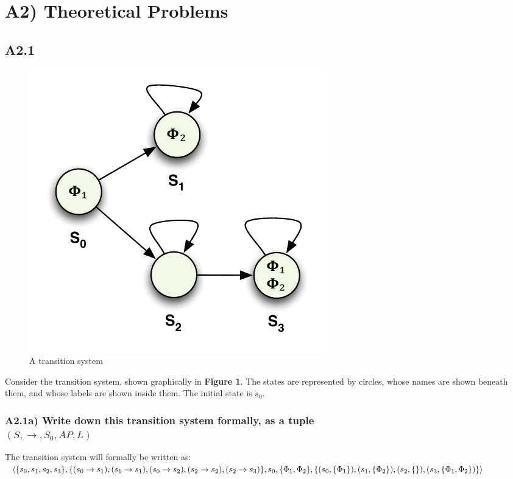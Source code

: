 \documentclass[12pt]{report}
\begin{document}
\section*{A2) Theoretical Problems}
\subsection*{A2.1}
\begin{figure}[H]
	\centering
	\includegraphics[scale=0.75]{../GFX/ExerciseFigure1.pdf}
	\caption{A transition system}
\end{figure}

Consider the transition system, shown graphically in \textbf{Figure 1}. The states are represented by circles, whose names are shown beneath them, and whose labels are shown inside them. The initial state is $s_0$.

\subsubsection*{A2.1a) Write down this transition system formally, as a tuple\\$(S,\rightarrow,S_0,AP,L)$}
The transition system will formally be written as:\\
$\langle\{s_0,s_1,s_2,s_3\},\{(s_0 \rightarrow s_1),(s_1 \rightarrow s_1),(s_0 \rightarrow s_2),(s_2 \rightarrow s_2),(s_2 \rightarrow s_3)\},s_0,\\
\{\Phi_1,\Phi_2\},\{(s_0, \{\Phi_1\}), (s_1, \{\Phi_2\}), (s_2, \{\}), (s_3, \{\Phi_1, \Phi_2\})\}\rangle$
\end{document}
